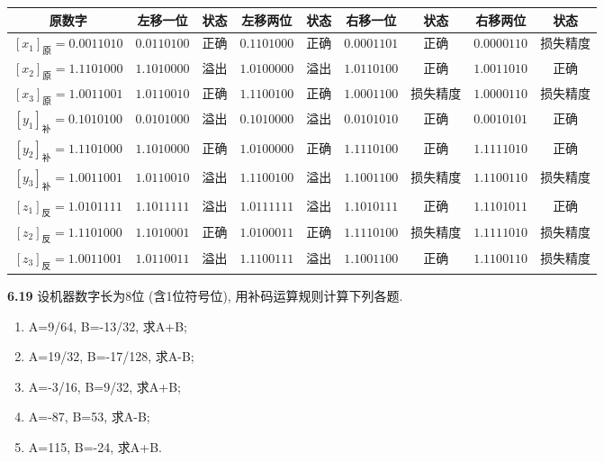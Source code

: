 \documentclass[UTF8]{report}
\newcommand{\problem}[1]{{\setlength{\parskip}{10pt}\noindent \bf{#1}}}
\newenvironment{solution}{{\noindent\hskip 2em \bf 解 \quad}}{}
\begin{document}
\begin{solution}

    \noindent
    \begin{tabular}{|c|c|c|c|c|c|c|c|c|}
        \hline
        原数字 & 左移一位 & 状态 & 左移两位 & 状态 & 右移一位 & 状态 & 右移两位 & 状态 \\
        \hline
        $[x_1]_{\text{原}} = 0.001 1010$ & $0.011 0100$ & 正确 & $0.110 1000$ & 正确 & $0.000 1101$ & 正确 & $0.000 0110$ & 损失精度 \\
        \hline
        $[x_2]_{\text{原}} = 1.110 1000$ & $1.101 0000$ & 溢出 & $1.010 0000$ & 溢出 & $1.011 0100$ & 正确 & $1.001 1010$ & 正确 \\
        \hline
        $[x_3]_{\text{原}} = 1.001 1001$ & $1.011 0010$ & 正确 & $1.110 0100$ & 正确 & $1.000 1100$ & 损失精度 & $1.000 0110$ & 损失精度 \\
        \hline
        $[y_1]_{\text{补}} = 0.101 0100$ & $0.010 1000$ & 溢出 & $0.101 0000$ & 溢出 & $0.010 1010$ & 正确 & $0.001 0101$ & 正确 \\
        \hline
        $[y_2]_{\text{补}} = 1.110 1000$ & $1.101 0000$ & 正确 & $1.010 0000$ & 正确 & $1.111 0100$ & 正确 & $1.111 1010$ & 正确 \\
        \hline
        $[y_3]_{\text{补}} = 1.001 1001$ & $1.011 0010$ & 溢出 & $1.110 0100$ & 溢出 & $1.100 1100$ & 损失精度 & $1.110 0110$ & 损失精度 \\
        \hline
        $[z_1]_{\text{反}} = 1.010 1111$ & $1.101 1111$ & 溢出 & $1.011 1111$ & 溢出 & $1.101 0111$ & 正确 & $1.110 1011$ & 正确 \\
        \hline
        $[z_2]_{\text{反}} = 1.110 1000$ & $1.101 0001$ & 正确 & $1.010 0011$ & 正确 & $1.111 0100$ & 损失精度 & $1.111 1010$ & 损失精度 \\
        \hline
        $[z_3]_{\text{反}} = 1.001 1001$ & $1.011 0011$ & 溢出 & $1.110 0111$ & 溢出 & $1.100 1100$ & 正确 & $1.110 0110$ & 损失精度 \\
        \hline
    \end{tabular}
\end{solution}
    



\problem{6.19} 设机器数字长为8位 (含1位符号位), 用补码运算规则计算下列各题.
\begin{enumerate}
    \item A=9/64, B=-13/32, 求A+B; 
    \item A=19/32, B=-17/128, 求A-B; 
    \item A=-3/16, B=9/32, 求A+B; 
    \item A=-87, B=53, 求A-B; 
    \item A=115, B=-24, 求A+B.
\end{enumerate}
\end{document}
